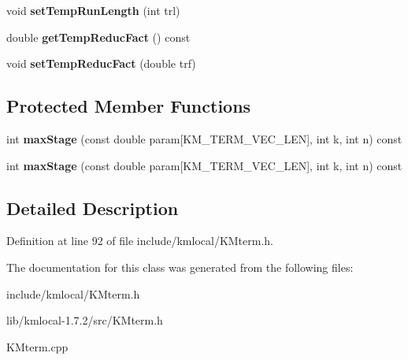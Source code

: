 \begin{DoxyCompactItemize}
\item 
\hypertarget{class_k_mterm_a1315f56a8a6e1a4afd418102f5066dc9}{
void {\bfseries setTempRunLength} (int trl)}
\label{class_k_mterm_a1315f56a8a6e1a4afd418102f5066dc9}

\item 
\hypertarget{class_k_mterm_a848dc310ab1f5bdcb1ede56409893e7e}{
double {\bfseries getTempReducFact} () const }
\label{class_k_mterm_a848dc310ab1f5bdcb1ede56409893e7e}

\item 
\hypertarget{class_k_mterm_a00156667d37450e2936e83d03f3e5f86}{
void {\bfseries setTempReducFact} (double trf)}
\label{class_k_mterm_a00156667d37450e2936e83d03f3e5f86}

\end{DoxyCompactItemize}
\subsection*{Protected Member Functions}
\begin{DoxyCompactItemize}
\item 
\hypertarget{class_k_mterm_a3f7f6da41b0ed71876d176f98258f34c}{
int {\bfseries maxStage} (const double param\mbox{[}KM\_\-TERM\_\-VEC\_\-LEN\mbox{]}, int k, int n) const }
\label{class_k_mterm_a3f7f6da41b0ed71876d176f98258f34c}

\item 
\hypertarget{class_k_mterm_a3f7f6da41b0ed71876d176f98258f34c}{
int {\bfseries maxStage} (const double param\mbox{[}KM\_\-TERM\_\-VEC\_\-LEN\mbox{]}, int k, int n) const }
\label{class_k_mterm_a3f7f6da41b0ed71876d176f98258f34c}

\end{DoxyCompactItemize}


\subsection{Detailed Description}


Definition at line 92 of file include/kmlocal/KMterm.h.



The documentation for this class was generated from the following files:\begin{DoxyCompactItemize}
\item 
include/kmlocal/KMterm.h\item 
lib/kmlocal-\/1.7.2/src/KMterm.h\item 
KMterm.cpp\end{DoxyCompactItemize}
